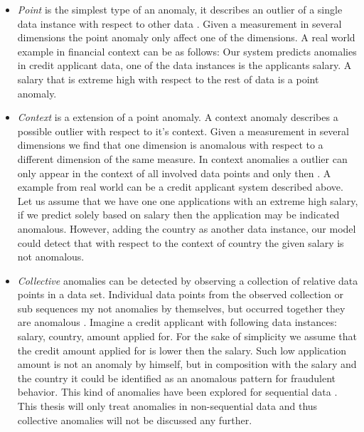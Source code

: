 \begin{itemize}
    \item \textit{Point} is the simplest type of an anomaly, it describes an outlier of a single data instance with respect to other data \cite{Chandola:2009:ADS:1541880.1541882}. Given a measurement in several dimensions the point anomaly only affect one of the dimensions. A real world example in financial context can be as follows: Our system predicts anomalies in credit applicant data, one of the data instances is the applicants salary. A salary that is extreme high with respect to the rest of data is a point anomaly.

    \item \textit{Context} is a extension of a point anomaly. A context anomaly describes a possible outlier with respect to it's context. Given a measurement in several dimensions we find that one dimension is anomalous with respect to a different dimension of the same measure. In context anomalies a outlier can only appear in the context of all involved data points and only then \cite{Chandola:2009:ADS:1541880.1541882}. A example from real world can be a credit applicant system described above. Let us assume that we have one one applications with an extreme high salary, if we predict solely based on salary then the application may be indicated anomalous. However, adding the country as another data instance, our model could detect that with respect to the context of country the given salary is not anomalous.

    \item \textit{Collective} anomalies can be detected by observing a collection of relative data points in a data set. Individual data points from the observed collection or sub sequences my not anomalies by themselves, but occurred together they are anomalous \cite{Chandola:2009:ADS:1541880.1541882}. Imagine a credit applicant with following data instances: salary, country, amount applied for. For the sake of simplicity we assume that the credit amount applied for is lower then the salary. Such low application amount is not an anomaly by himself, but in composition with the salary and the country it could be identified as an anomalous pattern for fraudulent behavior. This kind of anomalies have been explored for sequential data \cite{Warrender99detectingintrusion}. This thesis will only treat anomalies in non-sequential data and thus collective anomalies will not be discussed any further.
    
\end{itemize}

